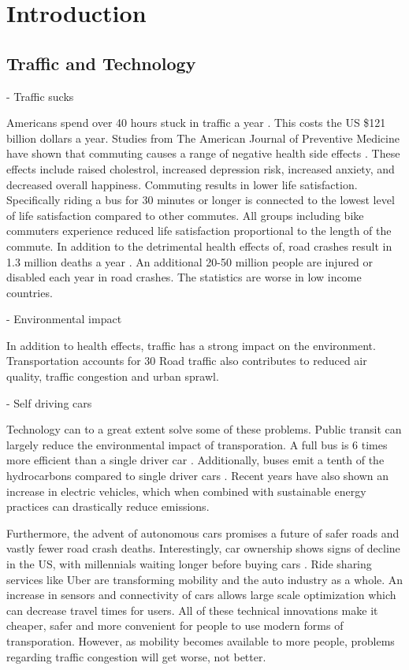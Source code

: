 \chapter{Introduction}

\section{Traffic and Technology}

- Traffic sucks

Americans spend over 40 hours stuck in traffic a year \cite{traffic}.
This costs the US \$121 billion dollars a year.
Studies from The American Journal of Preventive Medicine have shown that commuting causes a range of negative health side effects \cite{trafficandhealth}.
These effects include raised cholestrol, increased depression risk, increased anxiety, and decreased overall happiness.
Commuting results in lower life satisfaction.
Specifically riding a bus for 30 minutes or longer is connected to the lowest level of life satisfaction compared to other commutes.
All groups including bike commuters experience reduced life satisfaction proportional to the length of the commute.
In addition to the detrimental health effects of, road crashes result in 1.3 million deaths a year \cite{trafficdeaths}.
An additional 20-50 million people are injured or disabled each year in road crashes.
The statistics are worse in low income countries.

- Environmental impact

In addition to health effects, traffic has a strong impact on the environment.
Transportation accounts for 30%
Road traffic also contributes to reduced air quality, traffic congestion and urban sprawl.

- Self driving cars

Technology can to a great extent solve some of these problems.
Public transit can largely reduce the environmental impact of transporation.
A full bus is 6 times more efficient than a single driver car \cite{trafficenv}.
Additionally, buses emit a tenth of the hydrocarbons compared to single driver cars \cite{trafficenv}.
Recent years have also shown an increase in electric vehicles, which when combined with sustainable energy practices can drastically reduce emissions.

Furthermore, the advent of autonomous cars promises a future of safer roads and vastly fewer road crash deaths.
Interestingly, car ownership shows signs of decline in the US, with millennials waiting longer before buying cars \cite{cars}.
Ride sharing services like Uber are transforming mobility and the auto industry as a whole.
An increase in sensors and connectivity of cars allows large scale optimization which can decrease travel times for users.
All of these technical innovations make it cheaper, safer and more convenient for people to use modern forms of transporation.
However, as mobility becomes available to more people, problems regarding traffic congestion will get worse, not better.

